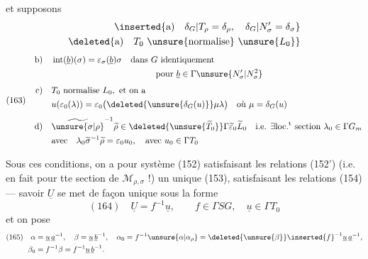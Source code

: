 et supposons 
\[
\begin{aligned}
\inserted{\text{a)}\quad\delta_G|T_\rho=\delta_\rho,\quad\delta_G|N'_\sigma=\delta_\sigma}\\
\deleted{\text{a)}\quad T_0\text{ \unsure{normalise} }\unsure{L_0}}
\end{aligned}
\]
\[
(163)\quad
\begin{aligned}
\text{b)}\quad&\operatorname{int}(\underline b)(\sigma)=\varepsilon_\sigma(\underline b)\sigma
\quad\text{dans }G\text{ identiquement}\\
&\hspace{12em}\text{pour }\underline b\in\Gamma\unsure{N'_\sigma|N^2_\sigma}\\[4pt]
\text{c)}\quad&T_0\text{ normalise }L_0,\text{ et on a}\\
&u(\varepsilon_0(\lambda))=
\varepsilon_0\bigl(\deleted{\unsure{\delta_G(u)}}\mu\lambda\bigr)
\quad\text{où }\mu=\delta_G(u)\\[4pt]
\text{d)}\quad&\widetilde{\unsure{\sigma|\rho}}^{-1}\widetilde\rho
\in\deleted{\unsure{\widetilde T_0}}\Gamma\widetilde\varepsilon_0\widetilde L_0
\quad\text{i.e. }\exists\text{loc.}^{\text{t}}\text{ section }\lambda_0\in\Gamma G_m\\
&\text{avec}\quad\lambda_0\widetilde\sigma^{-1}\widetilde\rho=\varepsilon_0u_0,
\quad\text{avec }u_0\in\Gamma T_0
\end{aligned}
\]

Sous ces conditions, on a pour  système (152) satisfaisant les relations (152') (i.e. en fait pour tte  section de $\mathcal M_{\rho,\sigma}$ !) un unique  (153), satisfaisant les relations (154) --- savoir $\underline U$ se met de façon unique sous la forme
\[
(164)\quad\underline U=f^{-1}\underline u,\qquad f\in\Gamma SG,\quad\underline u\in\Gamma T_0
\]
et on pose
\[
\begin{aligned}
(165)\quad\alpha&=\underline u\,\underline a^{-1},\quad
\beta=\underline u\,\underline b^{-1},\quad
\alpha_0=f^{-1}\unsure{\alpha|\alpha_\rho}=
\deleted{\unsure{\beta}}\inserted{f}^{-1}\underline u\,\underline a^{-1},\\
\beta_0&=f^{-1}\beta=f^{-1}\underline u\,\underline b^{-1}.
\end{aligned}
\]

